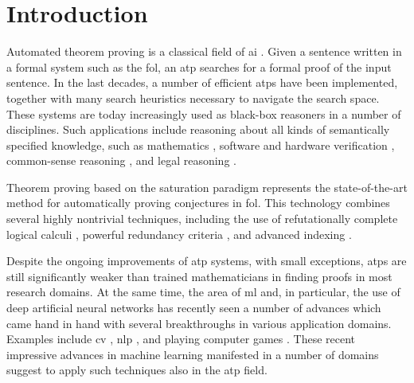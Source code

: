 \documentclass{article}
\begin{document}
\maketitle


\begin{abstract}

\end{abstract}

\section{Introduction}

Automated theorem proving is a classical field of \gls{ai} \cite{Russell2010}.
Given a sentence written in a formal system such as the \gls{fol},
an \gls{atp} searches for a formal proof of the input sentence.
In the last decades, a number of efficient \glspl{atp} have been implemented,
together with many search heuristics necessary to navigate the search space.
These systems are today increasingly used as black-box reasoners in a number of disciplines.
Such applications include reasoning about all kinds of semantically specified knowledge,
such as mathematics \cite{DBLP:conf/birthday/KinyonVV13},
software and hardware verification \cite{Ahrendt2016},
common-sense reasoning \cite{Pease2010},
and legal reasoning \cite{Passmore2017}.

Theorem proving based on the saturation paradigm \cite{DBLP:books/el/RV01/BachmairG01} represents the state-of-the-art method for automatically proving conjectures in \gls{fol}.
This technology combines several highly nontrivial techniques,
including the use of refutationally complete logical calculi \cite{DBLP:books/el/RV01/NieuwenhuisR01},
powerful redundancy criteria \cite{DBLP:books/el/RV01/BachmairG01},
and advanced indexing \cite{Voronkov1995}.

Despite the ongoing improvements of \gls{atp} systems, with small exceptions,
\glspl{atp} are still significantly weaker than trained mathematicians in finding proofs in most research domains.
At the same time, the area of \gls{ml} and, in particular, the use of deep artificial neural networks has recently seen a number of advances which came hand in hand with several breakthroughs in various application domains.
Examples include \acrlong{cv} \cite{CHAI2021100134},
\acrlong{nlp} \cite{8949185}, and
playing computer games \cite{shao2019survey}.
These recent impressive advances in machine learning manifested in a number of domains suggest to apply such techniques also in the \gls{atp} field.
\end{document}
